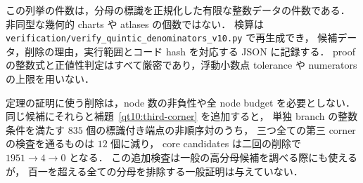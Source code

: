 この列挙の件数は，分母の標識を正規化した有限な整数データの件数である．
非同型な幾何的 charts や atlases の個数ではない．
検算は \texttt{verification/verify\_quintic\_denominators\_v10.py} で再生成でき，
候補データ，削除の理由，実行範囲とコード hash を対応する JSON に記録する．
proof の整数式と正値性判定はすべて厳密であり，浮動小数点 tolerance や numerators の上限を用いない．

定理の証明に使う削除は，node 数の非負性や全 node budget を必要としない．
同じ候補にそれらと補題~\ref{qt10:third-corner} を追加すると，
単独 branch の整数条件を満たす $835$ 個の標識付き端点の非順序対のうち，
三つ全ての第三 corner の検査を通るものは $12$ 個に減り，
core candidates は二回の削除で $1951\to4\to0$ となる．
この追加検査は一般の高分母候補を調べる際にも使えるが，
百一を超える全ての分母を排除する一般証明は与えていない．
